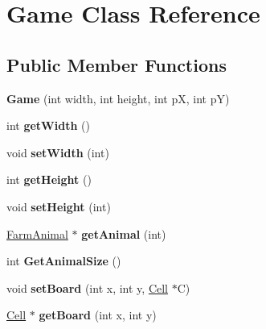 \hypertarget{class_game}{}\section{Game Class Reference}
\label{class_game}
\subsection*{Public Member Functions}
\begin{DoxyCompactItemize}
\item 
\mbox{\label{class_game_a624321721ba99f9a40e5c56eb6fff845}} 
{\bfseries Game} (int width, int height, int pX, int pY)
\item 
\mbox{\label{class_game_a009fd047c0faeeeb5c57e4d5e93208ac}} 
int {\bfseries get\+Width} ()
\item 
\mbox{\label{class_game_ae8d9f47d7430b57593eb379093161746}} 
void {\bfseries set\+Width} (int)
\item 
\mbox{\label{class_game_ab6d48e5ef16d80cb52e220fc2860e62a}} 
int {\bfseries get\+Height} ()
\item 
\mbox{\label{class_game_a426be250c4f87d0059d754c10c425685}} 
void {\bfseries set\+Height} (int)
\item 
\mbox{\label{class_game_a695982a6062e8f8fa0f6c28296d8f436}} 
\mbox{\hyperlink{class_farm_animal}{Farm\+Animal}} $\ast$ {\bfseries get\+Animal} (int)
\item 
\mbox{\label{class_game_a66f8b4086d1f5de3dc38e61b03086618}} 
int {\bfseries Get\+Animal\+Size} ()
\item 
\mbox{\label{class_game_ac520ce8fdbfea71722f2ccc98a9c6942}} 
void {\bfseries set\+Board} (int x, int y, \mbox{\hyperlink{class_cell}{Cell}} $\ast$C)
\item 
\mbox{\label{class_game_a00714b5f5435afe8217991bea2bbcaa5}} 
\mbox{\hyperlink{class_cell}{Cell}} $\ast$ {\bfseries get\+Board} (int x, int y)
\item 
\mbox{\label{class_game_ad20d26febca2acc52abc45aacbab8ca6}} 

\end{DoxyCompactItemize}
